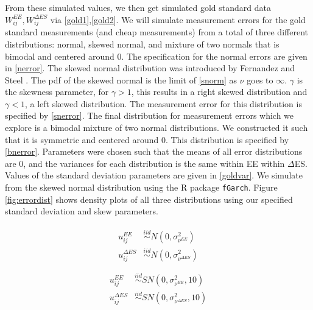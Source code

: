 \documentclass[11pt]{article}\usepackage[]{graphicx}\usepackage[]{color}
\begin{document}
From these simulated values, we then get simulated gold standard data $W_{ij}^{EE},W_{ij}^{\Delta ES}$ via \eqref{gold1},\eqref{gold2}. We will simulate measurement errors for the gold standard measurements (and cheap measurements) from a total of three different distributions: normal, skewed normal, and mixture of two normals that is bimodal and centered around 0. The specification for the normal errors are given in \eqref{nerror}. The skewed normal distribution was introduced by Fernandez and Steel \cite{fernandez}. The pdf of the skewed normal is the limit of \eqref{snorm} as $\nu$ goes to $\infty$. $\gamma$ is the skewness parameter, for $\gamma >1$, this results in a right skewed distribution and $\gamma <1$, a left skewed distribution. The measurement error for this distribution is specified by \eqref{snerror}. The final distribution for measurement errors which we explore is a bimodal mixture of two normal distributions. We constructed it such that it is symmetric and centered around 0. This distribution is specified by \eqref{bnerror}. Parameters were chosen such that the means of all error distributions are 0, and the variances for each distribution is the same within EE within $\Delta$ES. Values of the standard deviation parameters are given in \eqref{goldvar}. We simulate from the skewed normal distribution using the R package \texttt{fGarch}. Figure \eqref{fig:errordist} shows density plots of all three distributions using our specified standard deviation and skew parameters.  

\begin{multicols}{2}
\noindent 
  \begin{align}
  \begin{split}
  \label{nerror}
  u_{ij}^{EE} &\overset{iid}{\sim} N(0,\sigma_{\nu^{EE}}^2) \\
  u_{ij}^{\Delta ES} &\overset{iid}{\sim} N(0,\sigma_{\nu^{\Delta ES}}^2) \\
  \end{split}
  \end{align}
  \columnbreak
  \begin{align}
  \begin{split}
    \label{snerror}
  u_{ij}^{EE} &\overset{iid}{\sim} SN(0,\sigma_{\nu^{EE}}^2,10) \\
  u_{ij}^{\Delta ES} &\overset{iid}{\sim} SN(0,\sigma_{\nu^{\Delta ES}}^2,10) \\
  \end{split}
  \end{align}
\end{multicols}
\end{document}
